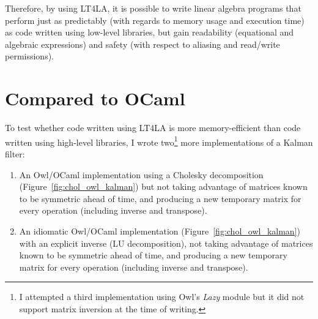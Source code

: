 Therefore, by using LT4LA, it is possible to write linear algebra programs that
perform just as predictably (with regards to memory usage and execution time)
as code written using low-level libraries, but gain readability (equational and
algebraic expressions) and safety (with respect to aliasing
and read/write permissions).

\section{Compared to OCaml}

To test whether code written using LT4LA is more memory-efficient than code
written using high-level libraries, I wrote two\footnote{I attempted a third
implementation using Owl's \emph{Lazy} module but it did not support matrix
inversion at the time of writing.} more implementations of a Kalman filter:

\begin{enumerate}
    \item An Owl/OCaml implementation using a Cholesky decomposition
        (Figure~\ref{fig:chol_owl_kalman}) but not taking advantage of matrices
        known to be symmetric ahead of time, and producing a new temporary
        matrix for every operation (including inverse and transpose).

    \item An idiomatic Owl/OCaml implementation
        (Figure~\ref{fig:chol_owl_kalman}) with an explicit inverse (LU
        decomposition), not taking advantage of matrices known to be symmetric
        ahead of time, and producing a new temporary matrix for every operation
        (including inverse and transpose).
\end{enumerate}

